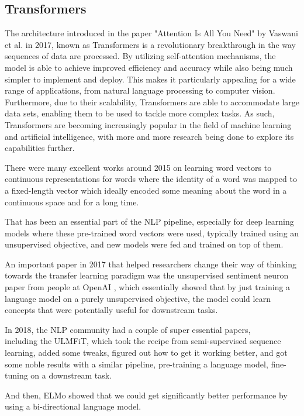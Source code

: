 \subsection{Transformers}

The architecture introduced in the paper "Attention Is All You Need" by Vaswani et al. in 2017\cite{https://doi.org/10.48550/arxiv.1706.03762}, known as Transformers is a revolutionary breakthrough in the way sequences of data are processed. By utilizing self-attention mechanisms, the model is able to achieve improved efficiency and accuracy while also being much simpler to implement and deploy. This makes it particularly appealing for a wide range of applications, from natural language processing to computer vision. Furthermore, due to their scalability, Transformers are able to accommodate large data sets, enabling them to be used to tackle more complex tasks. As such, Transformers are becoming increasingly popular in the field of machine learning and artificial intelligence, with more and more research being done to explore its capabilities further.

There were many excellent works around 2015 on learning word vectors to continuous representations for words where the identity of a word was mapped to a fixed-length vector which ideally encoded some meaning about the word in a continuous space and for a long time.

That has been an essential part of the NLP pipeline, especially for deep learning models where these pre-trained word vectors were used, typically trained using an unsupervised objective, and new models were fed and trained on top of them.

An important paper in 2017 that helped researchers change their way of thinking towards the transfer learning paradigm was the unsupervised sentiment neuron paper from people at OpenAI \cite{DBLP:journals/corr/RadfordJS17}, which essentially showed that by just training a language model on a purely unsupervised objective, the model could learn concepts that were potentially useful for downstream tasks.

In 2018, the NLP community had a couple of super essential papers, \\
including the ULMFiT\cite{ELMo}, which took the recipe from semi-supervised sequence learning, added some tweaks, figured out how to get it working better, and got some noble results with a similar pipeline, pre-training a language model, fine-tuning on a downstream task.

And then, ELMo\cite{ELMo} showed that we could get significantly better performance by using a bi-directional language model.

